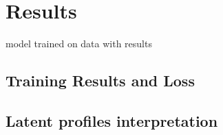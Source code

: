 \setchapterpreamble[u]{\margintoc}

\setchapterpreamble[u]{\margintoc}
\chapter{Results}

model trained on data with results
\section{Training Results and Loss}

\section{Latent profiles interpretation}

